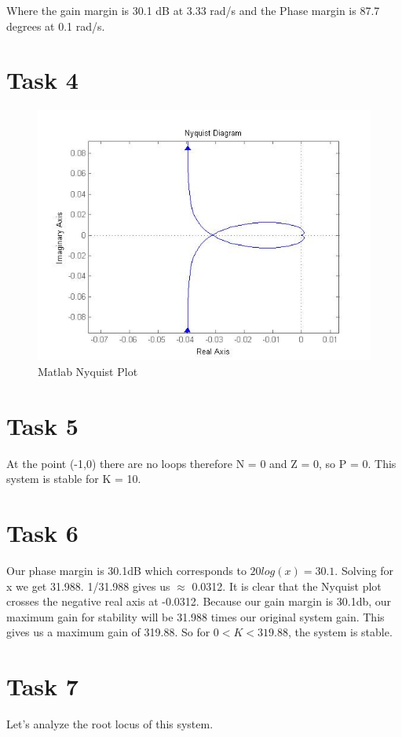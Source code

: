 \documentclass[12pt,letter]{article}
\begin{document}
\noindent Where the gain margin is 30.1 dB at 3.33 rad/s and the Phase margin is 87.7 degrees at 0.1 rad/s.
\section*{Task 4}
\begin{figure}[H]
\centering
\includegraphics[width=1\linewidth]{Task4}
\caption{Matlab Nyquist Plot}
\label{fig:Task4}
\end{figure}


\section*{Task 5}
At the point (-1,0) there are no loops therefore N = 0 and Z = 0, so P = 0. This system is stable for K = 10.

\section*{Task 6}
Our phase margin is 30.1dB which corresponds to $20log(x)=30.1$. Solving for x we get 31.988. 1/31.988 gives us $\approx$ 0.0312. It is clear that the Nyquist plot crosses the negative real axis at -0.0312. Because our gain margin is 30.1db, our maximum gain for stability will be 31.988 times our original system gain. This gives us a maximum gain of 319.88. So for $0< K < 319.88$, the system is stable.
\section*{Task 7}
Let's analyze the root locus of this system.
\end{document}
